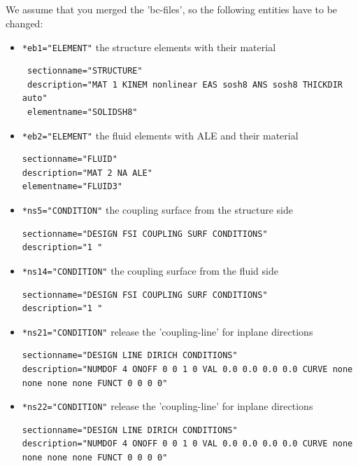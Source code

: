 \subsection{\bc}
We assume that you merged the 'bc-files', so the following entities have to be changed:

\begin{itemize}
 \item \verb|*eb1="ELEMENT"| \qquad the structure elements with their material
 \begin{small} \begin{verbatim}
 sectionname="STRUCTURE"
 description="MAT 1 KINEM nonlinear EAS sosh8 ANS sosh8 THICKDIR auto"
 elementname="SOLIDSH8"
 \end{verbatim} \end{small}
 
 \item \verb|*eb2="ELEMENT"| \qquad the fluid elements with ALE and their material
 \begin{small} \begin{verbatim}
sectionname="FLUID"
description="MAT 2 NA ALE"
elementname="FLUID3"
\end{verbatim} \end{small}

\item \verb|*ns5="CONDITION"|  \qquad the coupling surface from the structure side
\begin{small} \begin{verbatim}
sectionname="DESIGN FSI COUPLING SURF CONDITIONS"
description="1 "
 \end{verbatim} \end{small}
 
\item \verb|*ns14="CONDITION"| \qquad the coupling surface from the fluid side
\begin{small} \begin{verbatim}
sectionname="DESIGN FSI COUPLING SURF CONDITIONS"
description="1 "
 \end{verbatim} \end{small}
 
\item \verb|*ns21="CONDITION"| \qquad release the 'coupling-line' for inplane directions
\begin{small} \begin{verbatim}
sectionname="DESIGN LINE DIRICH CONDITIONS"
description="NUMDOF 4 ONOFF 0 0 1 0 VAL 0.0 0.0 0.0 0.0 CURVE none none none none FUNCT 0 0 0 0"
 \end{verbatim} \end{small}
 
\item \verb|*ns22="CONDITION"| \qquad release the 'coupling-line' for inplane directions
\begin{small} \begin{verbatim}
sectionname="DESIGN LINE DIRICH CONDITIONS"
description="NUMDOF 4 ONOFF 0 0 1 0 VAL 0.0 0.0 0.0 0.0 CURVE none none none none FUNCT 0 0 0 0"
 \end{verbatim} \end{small}
\end{itemize}

